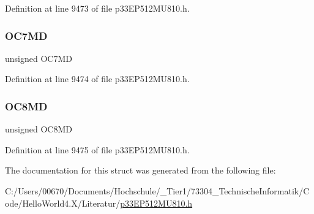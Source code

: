 Definition at line 9473 of file p33\+E\+P512\+M\+U810.\+h.

\mbox{\label{structtag_p_m_d2_b_i_t_s_ac482985ea838ba0adf7d1a1c73a09dc4}} 
\subsubsection{\texorpdfstring{O\+C7\+MD}{OC7MD}}
{\footnotesize\ttfamily unsigned O\+C7\+MD}



Definition at line 9474 of file p33\+E\+P512\+M\+U810.\+h.

\mbox{\label{structtag_p_m_d2_b_i_t_s_aa36bb076f105a4c034ef050cf8913273}} 
\subsubsection{\texorpdfstring{O\+C8\+MD}{OC8MD}}
{\footnotesize\ttfamily unsigned O\+C8\+MD}



Definition at line 9475 of file p33\+E\+P512\+M\+U810.\+h.



The documentation for this struct was generated from the following file\+:\begin{DoxyCompactItemize}
\item 
C\+:/\+Users/00670/\+Documents/\+Hochschule/\+\_\+\+Tier1/73304\+\_\+\+Technische\+Informatik/\+Code/\+Hello\+World4.\+X/\+Literatur/\hyperlink{p33_e_p512_m_u810_8h}{p33\+E\+P512\+M\+U810.\+h}\end{DoxyCompactItemize}
